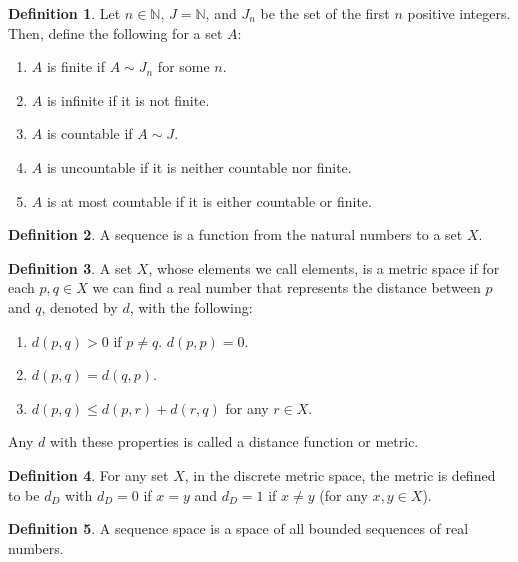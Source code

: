 \documentclass[12pt]{article}
\theoremstyle{definition}
\newtheorem{definition}{Definition}
\theoremstyle{named}
\begin{document}
\renewcommand{\thedefinition}{6.1}
\begin{definition}
    Let $n \in \mathbb{N}$, $J = \mathbb{N}$, and $J_n$ be the set of the first $n$ positive integers. Then, define the following for a set $A$: 
    \begin{enumerate}
        \item $A$ is finite if $A \sim J_n$ for some $n$. 
        \item $A$ is infinite if it is not finite. 
        \item $A$ is countable if $A \sim J$.
        \item $A$ is uncountable if it is neither countable nor finite.
        \item $A$ is at most countable if it is either countable or finite. 
    \end{enumerate}
\end{definition}

\renewcommand{\thedefinition}{6.1}
\begin{definition}
    A sequence is a function from the natural numbers to a set $X$.
\end{definition}

\renewcommand{\thedefinition}{6.1}
\begin{definition}
    A set $X$, whose elements we call elements, is a metric space if for each $p,q \in X$ we can find a real number that represents the distance between $p$ and $q$, denoted by $d$, with the following: 
    \begin{enumerate}
        \item $d(p,q) > 0$ if $p \neq q$. $d(p,p) = 0$.
        \item $d(p,q) = d(q,p)$.
        \item $d(p,q) \leq d(p,r) + d(r,q)$ for any $r \in X$.
    \end{enumerate}
    Any $d$ with these properties is called a distance function or metric. 
\end{definition}

\renewcommand{\thedefinition}{6.1}
\begin{definition}
    For any set $X$, in the discrete metric space, the metric is defined to be $d_D$ with $d_D = 0$ if $x=y$ and $d_D = 1$ if $x \neq y$ (for any $x,y \in X$). 
\end{definition}

\renewcommand{\thedefinition}{6.1}
\begin{definition}
    A sequence space is a space of all bounded sequences of real numbers. 
\end{definition}
\end{document}
